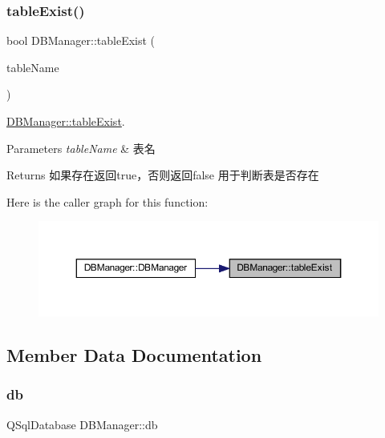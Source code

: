 \subsubsection{\texorpdfstring{tableExist()}{tableExist()}}
{\footnotesize\ttfamily bool D\+B\+Manager\+::table\+Exist (\begin{DoxyParamCaption}\item[{const Q\+String \&}]{table\+Name }\end{DoxyParamCaption})\hspace{0.3cm}{\ttfamily [private]}}



\mbox{\hyperlink{class_d_b_manager_a95518b4ffbf5b26550b18c7f7d1e471f}{D\+B\+Manager\+::table\+Exist}}. 


\begin{DoxyParams}{Parameters}
{\em table\+Name} & 表名 \\
\hline
\end{DoxyParams}
\begin{DoxyReturn}{Returns}
如果存在返回true，否则返回false 用于判断表是否存在 
\end{DoxyReturn}
Here is the caller graph for this function\+:
\nopagebreak
\begin{figure}[H]
\begin{center}
\leavevmode
\includegraphics[width=350pt]{class_d_b_manager_a95518b4ffbf5b26550b18c7f7d1e471f_icgraph}
\end{center}
\end{figure}


\subsection{Member Data Documentation}
\mbox{\label{class_d_b_manager_a5399b255096671fc8a5dd3ebf2dd0507}} 
\subsubsection{\texorpdfstring{db}{db}}
{\footnotesize\ttfamily Q\+Sql\+Database D\+B\+Manager\+::db\hspace{0.3cm}{\ttfamily [private]}}



